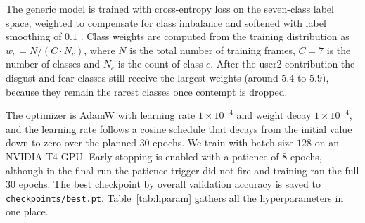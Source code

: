 \documentclass[12pt,a4paper]{article}
\begin{document}
The generic model is trained with cross-entropy loss on the
seven-class label space, weighted to compensate for class
imbalance and softened with label smoothing of $0.1$
\autocite{szegedy2016rethinking}. Class weights are computed
from the training distribution as $w_c = N / (C\cdot N_c)$,
where $N$ is the total number of training frames, $C=7$ is the
number of classes and $N_c$ is the count of class $c$. After
the user2 contribution the disgust and fear classes still
receive the largest weights (around $5.4$ to $5.9$), because
they remain the rarest classes once contempt is dropped.

The optimizer is AdamW \autocite{loshchilov2019adamw} with
learning rate $1\times 10^{-4}$ and weight decay
$1\times 10^{-4}$, and the learning rate follows a cosine
schedule that decays from the initial value down to zero over
the planned $30$ epochs. We train with batch size $128$ on an
NVIDIA T4 GPU. Early stopping is enabled with a patience of
$8$ epochs, although in the final run the patience trigger did
not fire and training ran the full $30$ epochs. The best
checkpoint by overall validation accuracy is saved to
\texttt{checkpoints/best.pt}. Table~\ref{tab:hparam} gathers
all the hyperparameters in one place.
\end{document}
